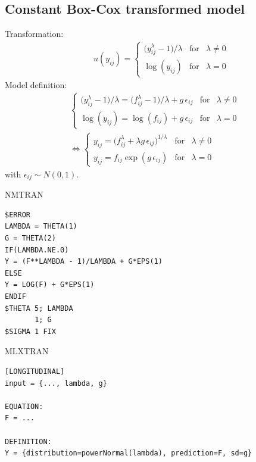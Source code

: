\subsection{Constant Box-Cox transformed model}
\label{model13}

Transformation:
\begin{eqnarray}
&& u(y_{ij}) =  \left\{ \begin{array}{lcl}  \big(y_{ij}^\lambda - 1\big)/\lambda  & \mbox{for} & \lambda  \neq 0 \\
\log(y_{ij})  & \mbox{for} & \lambda = 0 \nonumber
\end{array}\right.
\end{eqnarray}
Model definition:
\begin{eqnarray}
\left\{ \begin{array}{lcl}  \big(y_{ij}^\lambda - 1\big)/\lambda = \big(f_{ij}^\lambda - 1\big)/\lambda + g\,\epsilon_{ij} & \mbox{for} & \lambda  \neq 0  \\
\log(y_{ij})  = \log(f_{ij}) + g\,\epsilon_{ij}  & \mbox{for} & \lambda = 0
\end{array}\right. \nonumber \\
\Longleftrightarrow \left\{ \begin{array}{lcl}  y_{ij} = \big(f_{ij}^\lambda + \lambda g\, \epsilon_{ij} \big)^{1/ \lambda}& \mbox{for} & \lambda \neq 0  \\
y_{ij} = f_{ij} \exp(g\,\epsilon_{ij})  & \mbox{for} & \lambda  = 0
\end{array}\right. \nonumber
\end{eqnarray}
with $\epsilon_{ij} \sim N(0,1)$.

\bigskip
\begin{lrbox}{\lstbox}\begin{minipage}{16cm}
NMTRAN
\begin{lstlisting}[frame=single,language=NM]
$ERROR
LAMBDA = THETA(1)
G = THETA(2)
IF(LAMBDA.NE.0) 
Y = (F**LAMBDA - 1)/LAMBDA + G*EPS(1)
ELSE
Y = LOG(F) + G*EPS(1)
ENDIF
$THETA 5; LAMBDA
	   1; G
$SIGMA 1 FIX
\end{lstlisting}   
\end{minipage}\end{lrbox}
\usebox\lstbox

\bigskip
\begin{lrbox}{\lstbox}\begin{minipage}{16cm}
MLXTRAN
\begin{lstlisting}[frame=single,language=MLX]
[LONGITUDINAL]
input = {..., lambda, g}

EQUATION:
F = ...

DEFINITION:
Y = {distribution=powerNormal(lambda), prediction=F, sd=g}
\end{lstlisting}   
\end{minipage}\end{lrbox}
\usebox\lstbox

